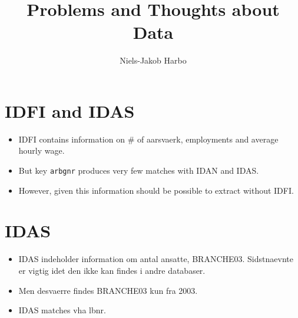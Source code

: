 \documentclass{article}
\title{Problems and Thoughts about Data}
\author{Niels-Jakob Harbo}
\begin{document}
\maketitle

\section{IDFI and IDAS}

\begin{itemize}
\item IDFI contains information on \# of aarsvaerk, employments and average hourly wage.
\item But key \texttt{arbgnr} produces very few matches with IDAN and IDAS.
\item However, given this information should be possible to extract without IDFI.
\end{itemize}

\section{IDAS}
\begin{itemize}
\item IDAS indeholder information om antal ansatte, BRANCHE03. Sidstnaevnte er vigtig idet den ikke kan findes i andre databaser. 
\item Men desvaerre findes BRANCHE03 kun fra 2003. 
\item IDAS matches vha lbnr.
\end{itemize}
\end{document}
